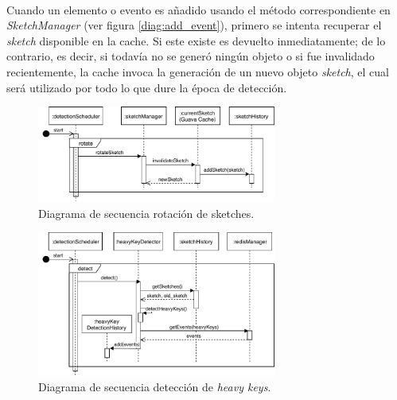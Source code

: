 \documentclass[a4paper,12pt, oneside]{article}
\begin{document}
\

Cuando un elemento o evento es añadido usando el método correspondiente en \textit{SketchManager} (ver figura \ref{diag:add_event}), primero se intenta recuperar el \textit{sketch} disponible en la cache. Si este existe es devuelto inmediatamente; de lo contrario, es decir, si todavía no se generó ningún objeto o si fue invalidado recientemente, la cache invoca la generación de un nuevo objeto \textit{sketch}, el cual será utilizado por todo lo que dure la época de detección. 

\begin{figure}[h]
	\centering
	\includegraphics[width=0.7\textwidth]{./graph/SecDiag-detectionSchedulerRotation.pdf}
	\caption{Diagrama de secuencia rotación de sketches.}
	\label{diag:sketch_rotation}
\end{figure}


\begin{figure}[b]
	\centering
	\includegraphics[width=0.7\textwidth]{./graph/SecDiag-detectionSchedulerDetect.pdf}
	\caption{Diagrama de secuencia detección de \textit{heavy keys}.}
	\label{diag:hk_detection}
\end{figure}
\end{document}
